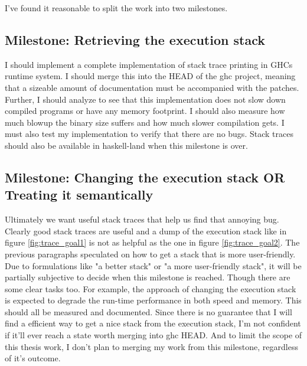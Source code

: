 I've found it reasonable to split the work into two milestones.

\subsection{Milestone: Retrieving the execution stack}

I should implement a complete implementation of stack trace printing in GHCs
runtime system. I should merge this into the HEAD of the ghc project, meaning
that a sizeable amount of documentation must be accompanied with the patches.
Further, I should analyze to see that this implementation does not slow down
compiled programs or have any memory footprint. I should also measure how much
blowup the binary size suffers and how much slower compilation gets. I must also
test my implementation to verify that there are no bugs. Stack traces should
also be available in haskell-land when this milestone is over.


\subsection{Milestone: Changing the execution stack OR Treating it semantically}

Ultimately we want useful stack traces that help us find that annoying bug.
Clearly good stack traces are useful and a dump of the execution stack like in
figure \ref{fig:trace_goal1} is not as helpful as the one in figure
\ref{fig:trace_goal2}. The previous
paragraphs speculated on how to get a stack that is more user-friendly. Due to
formulations like "a better stack" or "a more user-friendly stack", it will be
partially subjective to decide when this milestone is reached. Though there are
some clear tasks too. For example, the approach of changing the execution stack
is expected to degrade the run-time performance in both speed and memory. This
should all be measured and documented. Since there is no guarantee that I will
find a efficient way to get a nice stack from the execution stack, I'm not
confident if it'll ever reach a state worth merging into ghc HEAD. And to limit
the scope of this thesis work, I don't plan to merging my work from this
milestone, regardless of it's outcome.


